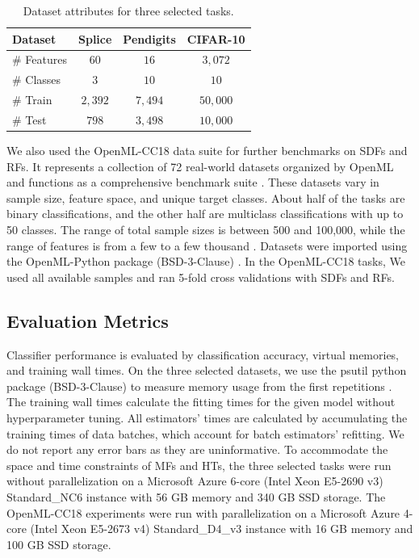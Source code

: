 \begin{table}[htb]
\centering
\begin{tabular}{lccc} 
\hline
Dataset & \textbf{Splice} & \textbf{Pendigits} & \textbf{CIFAR-10} \\
\hline
\# Features & $60$ & $16$ & $3,072$ \\
\hline
\# Classes & $3$ & $10$ & $10$ \\
\hline
\# Train & $2,392$ & $7,494$ & $50,000$ \\
\hline
\# Test & $798$ & $3,498$ & $10,000$ \\
\hline
\end{tabular}
\caption{Dataset attributes for three selected tasks.}
\label{table:data}
\end{table}

We also used the OpenML-CC18 data suite for further benchmarks on SDFs and RFs. It represents a collection of 72 real-world datasets organized by OpenML and functions as a comprehensive benchmark suite \citep{vanschoren_openml_2013, bischl_openml_2019}. These datasets vary in sample size, feature space, and unique target classes.
About half of the tasks are binary classifications, and the other half are multiclass classifications with up to 50 classes. The range of total sample sizes is between 500 and 100,000, while the range of features is from a few to a few thousand \citep{bischl_openml_2019}.
Datasets were imported using the OpenML-Python package (BSD-3-Clause) \citep{feurer_openml-python_2019}. In the OpenML-CC18 tasks, We used all available samples and ran 5-fold cross validations with SDFs and RFs.

\subsection{Evaluation Metrics}
Classifier performance is evaluated by classification accuracy, virtual memories, and training wall times. 
On the three selected datasets, we use the psutil python package (BSD-3-Clause) to measure memory usage from the first repetitions
\citep{rodola_giampaolopsutil_2022}.
The training wall times calculate the fitting times for the given model without hyperparameter tuning. All estimators' times are calculated by accumulating the training times of data batches, which account for batch estimators' refitting. We do not report any error bars as they are uninformative. 
To accommodate the space and time constraints of MFs and HTs, the three selected tasks were run without parallelization on a Microsoft Azure 6-core (Intel Xeon E5-2690 v3) Standard\_NC6 instance with 56 GB memory and 340 GB SSD storage.
The OpenML-CC18 experiments were run with parallelization on a Microsoft Azure 4-core (Intel Xeon E5-2673 v4) Standard\_D4\_v3 instance with 16 GB memory and 100 GB SSD storage.

